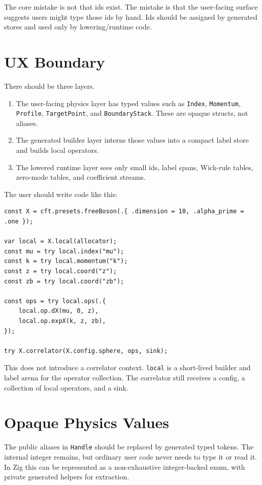 \documentclass[11pt]{article}
\begin{document}
The core mistake is not that ids exist.  The mistake is that the user-facing
surface suggests users might type those ids by hand.  Ids should be assigned by
generated stores and used only by lowering/runtime code.
\section{UX Boundary}
\label{sec:orgb013518}

There should be three layers.

\begin{enumerate}
\item The user-facing physics layer has typed values such as \texttt{Index}, \texttt{Momentum},
\texttt{Profile}, \texttt{TargetPoint}, and \texttt{BoundaryStack}.  These are opaque structs, not
aliases.
\item The generated builder layer interns those values into a compact label store
and builds local operators.
\item The lowered runtime layer sees only small ids, label spans, Wick-rule tables,
zero-mode tables, and coefficient streams.
\end{enumerate}

The user should write code like this:

\begin{verbatim}
const X = cft.presets.freeBoson(.{ .dimension = 10, .alpha_prime = .one });

var local = X.local(allocator);
const mu = try local.index("mu");
const k = try local.momentum("k");
const z = try local.coord("z");
const zb = try local.coord("zb");

const ops = try local.ops(.{
    local.op.dX(mu, 0, z),
    local.op.expX(k, z, zb),
});

try X.correlator(X.config.sphere, ops, sink);
\end{verbatim}

This does not introduce a correlator context.  \texttt{local} is a short-lived builder
and label arena for the operator collection.  The correlator still receives a
config, a collection of local operators, and a sink.
\section{Opaque Physics Values}
\label{sec:orgc5ce9e7}

The public aliases in \texttt{Handle} should be replaced by generated typed tokens.
The internal integer remains, but ordinary user code never needs to type it or
read it.  In Zig this can be represented as a non-exhaustive integer-backed
enum, with private generated helpers for extraction.
\end{document}
